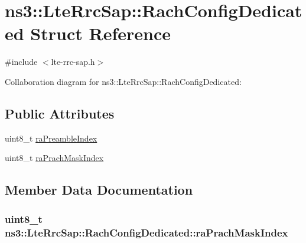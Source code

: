 \hypertarget{structns3_1_1LteRrcSap_1_1RachConfigDedicated}{}\section{ns3\+:\+:Lte\+Rrc\+Sap\+:\+:Rach\+Config\+Dedicated Struct Reference}
\label{structns3_1_1LteRrcSap_1_1RachConfigDedicated}


{\ttfamily \#include $<$lte-\/rrc-\/sap.\+h$>$}



Collaboration diagram for ns3\+:\+:Lte\+Rrc\+Sap\+:\+:Rach\+Config\+Dedicated\+:
\subsection*{Public Attributes}
\begin{DoxyCompactItemize}
\item 
uint8\+\_\+t \hyperlink{structns3_1_1LteRrcSap_1_1RachConfigDedicated_aa5ca0ba69db290c985fd26a87b44ee5e}{ra\+Preamble\+Index}
\item 
uint8\+\_\+t \hyperlink{structns3_1_1LteRrcSap_1_1RachConfigDedicated_adf2197c516832f91e8aa0035f23e97ec}{ra\+Prach\+Mask\+Index}
\end{DoxyCompactItemize}


\subsection{Member Data Documentation}
\subsubsection[{\texorpdfstring{ra\+Prach\+Mask\+Index}{raPrachMaskIndex}}]{\setlength{\rightskip}{0pt plus 5cm}uint8\+\_\+t ns3\+::\+Lte\+Rrc\+Sap\+::\+Rach\+Config\+Dedicated\+::ra\+Prach\+Mask\+Index}\hypertarget{structns3_1_1LteRrcSap_1_1RachConfigDedicated_adf2197c516832f91e8aa0035f23e97ec}{}\label{structns3_1_1LteRrcSap_1_1RachConfigDedicated_adf2197c516832f91e8aa0035f23e97ec}
